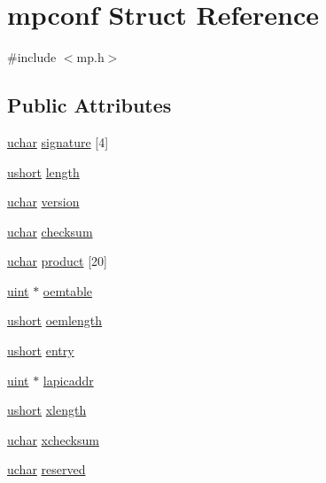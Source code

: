 \hypertarget{structmpconf}{}\section{mpconf Struct Reference}
\label{structmpconf}


{\ttfamily \#include $<$mp.\+h$>$}

\subsection*{Public Attributes}
\begin{DoxyCompactItemize}
\item 
\hyperlink{custom__types_8h_a65f85814a8290f9797005d3b28e7e5fc}{uchar} \hyperlink{structmpconf_a7bf26b6b2b09d4265ffcbdb362bc5c8b}{signature} \mbox{[}4\mbox{]}
\item 
\hyperlink{custom__types_8h_ab95f123a6c9bcfee6a343170ef8c5f69}{ushort} \hyperlink{structmpconf_a6b7583180c78b6a2e490d6c72779d8dd}{length}
\item 
\hyperlink{custom__types_8h_a65f85814a8290f9797005d3b28e7e5fc}{uchar} \hyperlink{structmpconf_ade1055584605c76f4e1134d6631e0afa}{version}
\item 
\hyperlink{custom__types_8h_a65f85814a8290f9797005d3b28e7e5fc}{uchar} \hyperlink{structmpconf_aac54c4c7710b90574416a945cdcd3b9e}{checksum}
\item 
\hyperlink{custom__types_8h_a65f85814a8290f9797005d3b28e7e5fc}{uchar} \hyperlink{structmpconf_ac4e4d4d150aac8ea0bba92ff2cfae557}{product} \mbox{[}20\mbox{]}
\item 
\hyperlink{custom__types_8h_a91ad9478d81a7aaf2593e8d9c3d06a14}{uint} $\ast$ \hyperlink{structmpconf_a1b3e44d3639e8f3117e6bca9626d680b}{oemtable}
\item 
\hyperlink{custom__types_8h_ab95f123a6c9bcfee6a343170ef8c5f69}{ushort} \hyperlink{structmpconf_a5aaf9c7afa2f1be645b8e633f6ff43a1}{oemlength}
\item 
\hyperlink{custom__types_8h_ab95f123a6c9bcfee6a343170ef8c5f69}{ushort} \hyperlink{structmpconf_a75f67295a180d1f72b93be82e09ecc2a}{entry}
\item 
\hyperlink{custom__types_8h_a91ad9478d81a7aaf2593e8d9c3d06a14}{uint} $\ast$ \hyperlink{structmpconf_a087fac7e9dc4ca1fdfe142b3adf96c99}{lapicaddr}
\item 
\hyperlink{custom__types_8h_ab95f123a6c9bcfee6a343170ef8c5f69}{ushort} \hyperlink{structmpconf_adbda8ec5a43970662e7eab8f8da11817}{xlength}
\item 
\hyperlink{custom__types_8h_a65f85814a8290f9797005d3b28e7e5fc}{uchar} \hyperlink{structmpconf_a499447fb50cb158a848f66f124dd8f8d}{xchecksum}
\item 
\hyperlink{custom__types_8h_a65f85814a8290f9797005d3b28e7e5fc}{uchar} \hyperlink{structmpconf_ab7ce4c5b90a538f41baefef6714d1a23}{reserved}
\end{DoxyCompactItemize}


